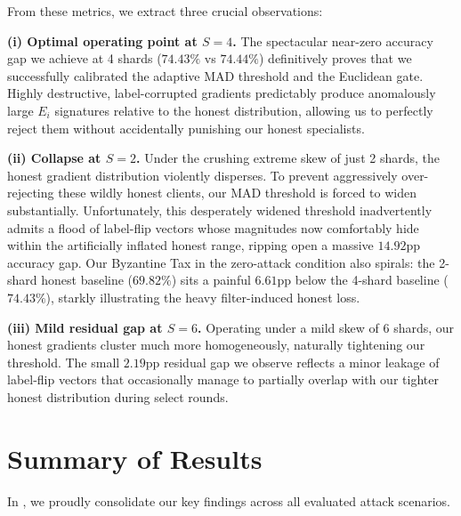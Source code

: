 \documentclass[../main.tex]{subfiles}
\begin{document}
From these metrics, we extract three crucial observations:

\textbf{(i) Optimal operating point at $S=4$.}
The spectacular near-zero accuracy gap we achieve at 4 shards ($74.43\%$ vs $74.44\%$) definitively proves that we successfully calibrated the adaptive MAD threshold and the Euclidean gate. Highly destructive, label-corrupted gradients predictably produce anomalously large $E_i$ signatures relative to the honest distribution, allowing us to perfectly reject them without accidentally punishing our honest specialists.

\textbf{(ii) Collapse at $S=2$.}
Under the crushing extreme skew of just 2 shards, the honest gradient distribution violently disperses. To prevent aggressively over-rejecting these wildly honest clients, our MAD threshold is forced to widen substantially. Unfortunately, this desperately widened threshold inadvertently admits a flood of label-flip vectors whose magnitudes now comfortably hide within the artificially inflated honest range, ripping open a massive $14.92$pp accuracy gap. Our Byzantine Tax in the zero-attack condition also spirals: the 2-shard honest baseline ($69.82\%$) sits a painful $6.61$pp below the 4-shard baseline ($74.43\%$), starkly illustrating the heavy filter-induced honest loss.

\textbf{(iii) Mild residual gap at $S=6$.}
Operating under a mild skew of 6 shards, our honest gradients cluster much more homogeneously, naturally tightening our threshold. The small $2.19$pp residual gap we observe reflects a minor leakage of label-flip vectors that occasionally manage to partially overlap with our tighter honest distribution during select rounds.

\section{Summary of Results}
\label{sec:results_summary}

In , we proudly consolidate our key findings across all evaluated attack scenarios.
\end{document}
